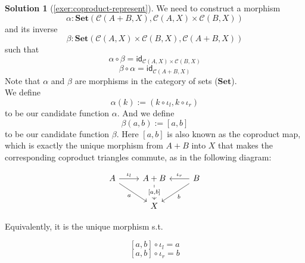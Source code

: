 \documentclass[a4paper,11pt, oneside,titlepage=false]{scrbook}
\theoremstyle{plain}
\theoremstyle{definition}
\newtheorem{solution}[thm]{Solution}
\newcommand{\cfont}[1]{\ensuremath{\mathsf{#1}}}
\newcommand{\Cat}[1]{\mathcal{#1}}
\newcommand{\CC}{\Cat{C}}
\newcommand{\Catb}[1]{\mathbf{#1}}
\newcommand{\SET}{\Catb{Set}}
\newcommand{\Id}[1][]{\cfont{id}_{#1}}
\newcommand{\inl}{\ensuremath{\iota_l}}
\newcommand{\inr}{\ensuremath{\iota_r}}
\newcommand{\outofcoproduct}[2]{\ensuremath{[ #1, #2 ]}}
\newcommand{\co}[2]{\ensuremath{#2 \circ #1}}
\begin{document}
\begin{solution}[\cref{exer:coproduct-represent}]\label{sol:coproduct-represent}
\newcommand{\CP}{\CC(A+B,X)}
\newcommand{\CQ}{\CC(A,X)\times\CC(B,X)}
\newcommand{\PP}{\CC(X,A\times B)}
\newcommand{\PQ}{\CC(X,A)\times\CC(X,B)}
 We need to construct a morphism \[\alpha:\SET(\CP, \CQ)\] and its inverse \[\beta:\SET(\CQ, \CP)\]
such that
\begin{equation}
\label{coproduct-iso-1}
    \alpha \circ \beta = \Id[\CQ]
\end{equation}
\begin{equation}
\label{coproduct-iso-2}
    \beta \circ \alpha = \Id[\CP]
\end{equation}
%
Note that $\alpha$ and $\beta$ are morphisms in the category of sets ($\SET$).\\

We define \[\alpha(k):=(\co {\inl} {k}, \co {\inr} {k})\] to be our candidate function $\alpha$. And we define \[\beta(a,b):= \outofcoproduct{a}{b}\] to be our candidate function $\beta$. Here $\outofcoproduct{a}{b}$ is also known as the coproduct map, which is exactly the unique morphism from $A+B$ into $X$ that makes the corresponding coproduct triangles commute, as in the following diagram:

\[
\begin{tikzcd}
A \arrow[r, "\inl"] \arrow[rd, "a"'] & A+B \arrow[d, "{\outofcoproduct{a}{b}}" description] & B \arrow[l, "\inr"'] \arrow[ld, "b"] \\
                                    & X                                    &
\end{tikzcd}
\]

Equivalently, it is the unique morphism s.t.

\begin{equation}
\label{coproduct-iso-inl}
    \co {\inl} {\outofcoproduct{a}{b}} = a
\end{equation}
\begin{equation}
\label{coproduct-iso-inr}
    \co {\inr} {\outofcoproduct{a}{b}} = b
\end{equation}


\end{solution}
\end{document}
